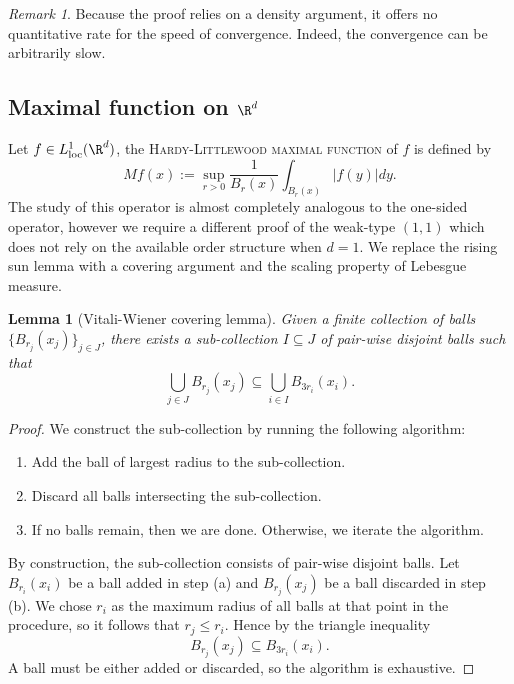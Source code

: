 \documentclass[reqno]{amsart}
\newtheorem{lemma}[theorem]{Lemma}
\theoremstyle{definition}
\theoremstyle{remark}
\newtheorem*{remark}{Remark}
\renewcommand{\emph}{\textsc}
\begin{document}
\begin{remark}
	Because the proof relies on a density argument, it offers no quantitative rate for the speed of convergence. Indeed, the convergence can be arbitrarily slow.
\end{remark}

\subsection{Maximal function on $\R^d$}

Let $f \in L^1_{\text{loc}} (\R^d)$, the \emph{Hardy-Littlewood maximal function} of $f$ is defined by
	\[ Mf (x) := \sup_{r > 0} \frac{1}{B_r (x)} \int_{B_r (x)} |f(y)| dy. \]
The study of this operator is almost completely analogous to the one-sided operator, however we require a different proof of the weak-type $(1, 1)$ which does not rely on the available order structure when $d = 1$. We replace the rising sun lemma with a covering argument and the scaling property of Lebesgue measure. 

\begin{lemma}[Vitali-Wiener covering lemma]
	Given a finite collection of balls $\{ B_{r_j} (x_j) \}_{j \in J}$, there exists a sub-collection $I \subseteq J$ of pair-wise disjoint balls such that
		\[ \bigcup_{j \in J} B_{r_j} (x_j) \subseteq \bigcup_{i \in I} B_{3r_i} (x_i). \]
\end{lemma}

\begin{proof}
	We construct the sub-collection by running the following algorithm:
	\begin{enumerate}
		\item Add the ball of largest radius to the sub-collection.
		\item Discard all balls intersecting the sub-collection. 
		\item If no balls remain, then we are done. Otherwise, we iterate the algorithm. 
	\end{enumerate}
	By construction, the sub-collection consists of pair-wise disjoint balls. Let $B_{r_i} (x_i)$ be a ball added in step (a) and $B_{r_j} (x_j)$ be a ball discarded in step (b). We chose $r_i$ as the maximum radius of all balls at that point in the procedure, so it follows that $r_j \leq r_i$. Hence by the triangle inequality
		\[ B_{r_j} (x_j) \subseteq B_{3r_i} (x_i). \]
	A ball must be either added or discarded, so the algorithm is exhaustive.
\end{proof}
\end{document}
